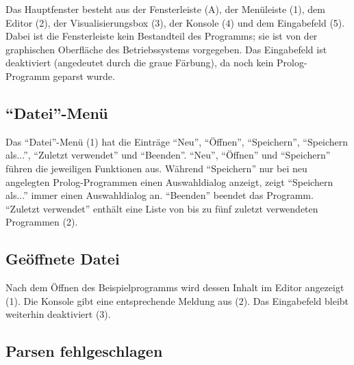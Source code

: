 \documentclass[parskip=full,11pt,twoside]{scrartcl}
\begin{document}
Das Hauptfenster besteht aus der Fensterleiste (A), der Menüleiste (1), dem Editor (2), der Visualisierungsbox (3), der Konsole (4) und dem Eingabefeld (5).
Dabei ist die Fensterleiste kein Bestandteil des Programms; sie ist von der graphischen Oberfläche des Betriebssystems vorgegeben.
Das Eingabefeld ist deaktiviert (angedeutet durch die graue Färbung), da noch kein Prolog-Programm geparst wurde.

\subsection{\enquote{Datei}-Menü}

\begin{minipage}{\linewidth}
\end{minipage}

Das \enquote{Datei}-Menü (1) hat die Einträge \enquote{Neu}, \enquote{Öffnen}, \enquote{Speichern}, \enquote{Speichern als...}, \enquote{Zuletzt verwendet} und \enquote{Beenden}.
\enquote{Neu}, \enquote{Öffnen} und \enquote{Speichern} führen die jeweiligen Funktionen aus.
Während \enquote{Speichern} nur bei neu angelegten Prolog-Programmen einen Auswahldialog anzeigt, zeigt \enquote{Speichern als...} immer einen Auswahldialog an.
\enquote{Beenden} beendet das Programm.
\enquote{Zuletzt verwendet} enthält eine Liste von bis zu fünf zuletzt verwendeten Programmen (2).

\subsection{Geöffnete Datei}

\begin{minipage}{\linewidth}
\end{minipage}

Nach dem Öffnen des Beispielprogramms wird dessen Inhalt im Editor angezeigt (1).
Die Konsole gibt eine entsprechende Meldung aus (2).
Das Eingabefeld bleibt weiterhin deaktiviert (3).

\subsection{Parsen fehlgeschlagen}
\end{document}
